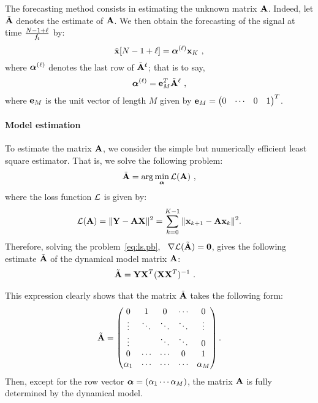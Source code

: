 The forecasting method consists in estimating the unknown matrix ${\mathbf A}$. Indeed, let $\tilde{{\mathbf A}}$ denotes the estimate of ${\mathbf A}$. We then obtain the forecasting of the signal at time $\frac{N-1+\ell}{f_{\mathsf s}}$ by:
\begin{equation}
\label{eq:prediction}
\tilde \bx [N-1+\ell] = \balpha^{(\ell)}\bx_{K}\ ,
\end{equation}  
where $\boldsymbol{\alpha}^{(\ell)}$ denotes the last row of $\tilde{{\mathbf A}}^\ell$; that is to say,
\begin{equation}
\balpha^{(\ell)}=\be_M^T\tilde\bA^\ell\ ,
\label{eq:alpha.l}
\end{equation}
where ${\mathbf e}_M$ is the unit vector of length $M$ given by ${\mathbf e}_M = \begin{pmatrix} 0 & \cdots & 0 & 1\end{pmatrix}^T$.

\paragraph{Model estimation} To estimate the matrix ${\mathbf A}$, we consider the simple but numerically efficient least square estimator. That is, we solve the following problem:
\begin{equation}
\label{eq:ls.pb}
\tilde\bA = \arg\min_{\balpha} \cL(\bA)\ ,
\end{equation}
where the loss function ${\mathcal L}$ is given by:
\[
{\mathcal L}({\mathbf A}) = \|{\mathbf Y}-{\mathbf A}{\mathbf X}\|^2 = \sum_{k=0}^{K-1} \|{\mathbf x}_{k+1}-{\mathbf A}{\mathbf x}_k\|^2.
\]
Therefore, solving the problem~\eqref{eq:ls.pb}, \ie~$\nabla {\mathcal L}(\tilde{{\mathbf A}})=\boldsymbol{0}$, gives the following estimate $\tilde{{\mathbf A}}$ of the dynamical model matrix ${\mathbf A}$:
\begin{align}
\tilde\bA &= \bY\bX^T(\bX\bX^T)^{-1}\ .
\label{eq:lse}
\end{align}

\begin{remark}
This expression clearly shows that the matrix $\tilde{{\mathbf A}}$ takes the following form:
\[
\tilde{{\mathbf A}} =
\begin{pmatrix}
0       & 1       & 0      & \cdots & 0      \\
\vdots  & \ddots  & \ddots & \ddots & \vdots  \\
\vdots  &         & \ddots & \ddots & 0  \\
0       & \cdots  & \cdots & 0      & 1  \\
\alpha_1& \cdots  & \cdots & \cdots & \alpha_M  \\
\end{pmatrix}.
\]
Then, except for the row vector $\boldsymbol{\alpha} = \left(\alpha_1 \cdots\alpha_M\right)$, the matrix ${\mathbf A}$ is fully determined by the dynamical model.
\end{remark}


